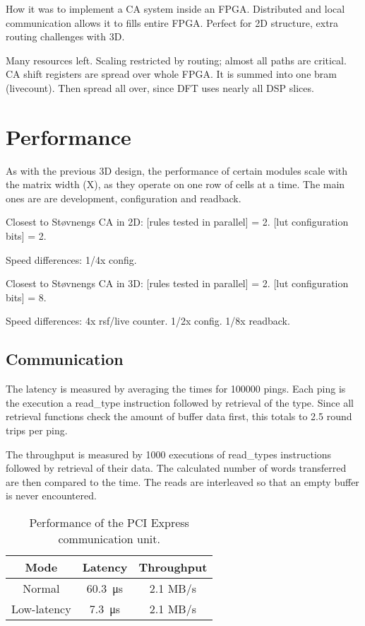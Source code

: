 \TODO
How it was to implement a CA system inside an FPGA.
Distributed and local communication allows it to fills entire FPGA.
Perfect for 2D structure, extra routing challenges with 3D.

\TODO
Many resources left.
Scaling restricted by routing; almost all paths are critical.
CA shift registers are spread over whole FPGA.
It is summed into one bram (livecount).
Then spread all over, since DFT uses nearly all DSP slices.


\section{Performance}

\TODO

As with the previous 3D design, the performance of certain modules scale with the matrix width (X), as they operate on one row of cells at a time.
The main ones are are development, configuration and readback.

Closest to Støvnengs CA in 2D:
[rules tested in parallel] = 2.
[lut configuration bits] = 2.

Speed differences:
1/4x config.

Closest to Støvnengs CA in 3D:
[rules tested in parallel] = 2.
[lut configuration bits] = 8.

Speed differences:
4x rsf/live counter.
1/2x config.
1/8x readback.


\subsection{Communication}


The latency is measured by averaging the times for 100000 pings.
Each ping is the execution a read\_type instruction followed by retrieval of the type.
Since all retrieval functions check the amount of buffer data first, this totals to 2.5 round trips per ping.

The throughput is measured by 1000 executions of read\_types instructions followed by retrieval of their data.
The calculated number of words transferred are then compared to the time.
The reads are interleaved so that an empty buffer is never encountered.

\begin{table}[!ht]
    \renewcommand{\arraystretch}{1.4}
    \centering
    \begin{tabular}{c|c|c}
        \bfseries Mode & \bfseries Latency & \bfseries Throughput \\
        \hline
        Normal & \SI{60.3}{\micro\second} & 2.1 MB/s \\
        Low-latency & \SI{7.3}{\micro\second} & 2.1 MB/s \\
    \end{tabular}
    \caption[Communication performance]{
        Performance of the PCI Express communication unit.
    }
    \label{tab:communication-performance}
\end{table}


